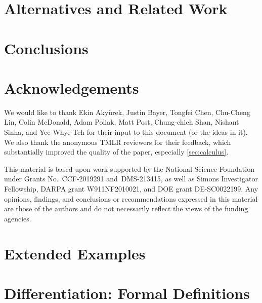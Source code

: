 \documentclass[10pt]{article}
\theoremstyle{definition}
\begin{document}
\section{Alternatives and Related Work}


\section{Conclusions}


\section*{Acknowledgements}

We would like to thank Ekin Aky\"{u}rek, Justin Bayer, Tongfei Chen, Chu-Cheng Lin, Colin McDonald, Adam Poliak, Matt Post, Chung-chieh Shan, Nishant Sinha, and Yee Whye Teh for their input to this document (or the ideas in it). We also thank the anonymous TMLR reviewers for their feedback, which substantially improved the quality of the paper, especially \cref{sec:calculus}.

This material is based upon work supported by the National Science Foundation under Grants No.~CCF-2019291 and~DMS-213415, as well as Simons Investigator Fellowship, DARPA grant W911NF2010021, and DOE grant DE-SC0022199. 
Any opinions, findings, and conclusions or recommendations expressed in this material are those of the authors and do not necessarily reflect the views of the funding agencies.

\iffalse %
\section*{References}
\fi



\appendix

\section{Extended Examples}
\label{sec:examples_long}


\section{Differentiation: Formal Definitions}
\label{sec:calculus_formal}



\end{document}
